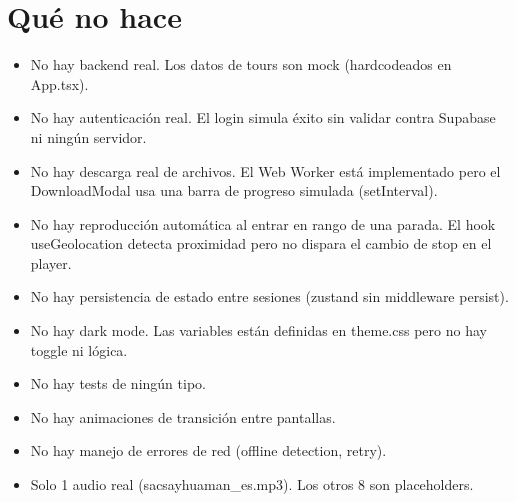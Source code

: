 \documentclass[11pt,a4paper]{article}
\begin{document}
\section{Qué no hace}
\begin{itemize}[nosep]
  \item No hay backend real. Los datos de tours son mock (hardcodeados en App.tsx).
  \item No hay autenticación real. El login simula éxito sin validar contra Supabase ni ningún servidor.
  \item No hay descarga real de archivos. El Web Worker está implementado pero el DownloadModal usa una barra de progreso simulada (setInterval).
  \item No hay reproducción automática al entrar en rango de una parada. El hook useGeolocation detecta proximidad pero no dispara el cambio de stop en el player.
  \item No hay persistencia de estado entre sesiones (zustand sin middleware persist).
  \item No hay dark mode. Las variables están definidas en theme.css pero no hay toggle ni lógica.
  \item No hay tests de ningún tipo.
  \item No hay animaciones de transición entre pantallas.
  \item No hay manejo de errores de red (offline detection, retry).
  \item Solo 1 audio real (sacsayhuaman\_es.mp3). Los otros 8 son placeholders.
\end{itemize}
\end{document}

